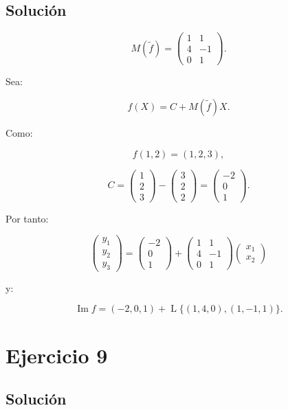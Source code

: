 \documentclass[11pt,a4paper]{article}
\newcommand{\Span}{\operatorname{L}}
\newcommand{\Ima}{\operatorname{Im}}
\begin{document}
\subsection{Solución}

\[
M(\widetilde f)
=
\begin{pmatrix}
1&1\\
4&-1\\
0&1
\end{pmatrix}.
\]

Sea:

\[
f(X)=C+M(\widetilde f)X.
\]

Como:

\[
f(1,2)=(1,2,3),
\]

\[
C=
\begin{pmatrix}
1\\2\\3
\end{pmatrix}
-
\begin{pmatrix}
3\\2\\2
\end{pmatrix}
=
\begin{pmatrix}
-2\\0\\1
\end{pmatrix}.
\]

Por tanto:

\[
\boxed{
\begin{pmatrix}
y_1\\y_2\\y_3
\end{pmatrix}
=
\begin{pmatrix}
-2\\0\\1
\end{pmatrix}
+
\begin{pmatrix}
1&1\\
4&-1\\
0&1
\end{pmatrix}
\begin{pmatrix}
x_1\\x_2
\end{pmatrix}
}
\]

y:

\[
\boxed{
\Ima f
=
(-2,0,1)
+
\Span\{(1,4,0),(1,-1,1)\}.
}
\]

\section{Ejercicio 9}
\subsection{Solución}
\end{document}
